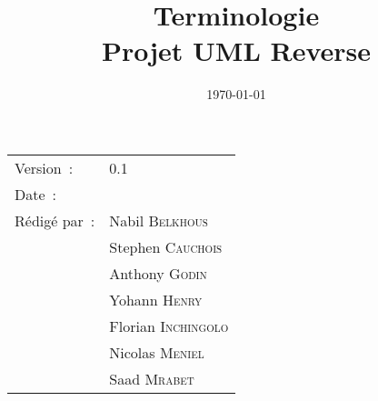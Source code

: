 \documentclass[hidelinks, 10pt,a4paper]{article}
\title{\bfseries Terminologie\\Projet UML Reverse}
\begin{document}
\maketitle
\begin{center}
\begin{tabular}{ll}
  Version~: & 0.1\\[.5em]
  Date~: & \date{\today}\\[.5em]
  Rédigé par~: & Nabil \textsc{Belkhous}\\
               & Stephen \textsc{Cauchois}\\
               & Anthony \textsc{Godin}\\
               & Yohann \textsc{Henry}\\
               & Florian \textsc{Inchingolo}\\
               & Nicolas \textsc{Meniel}\\
               & Saad \textsc{Mrabet}\\[.5em]

\end{tabular}
\end{center}

\newpage
\end{document}
